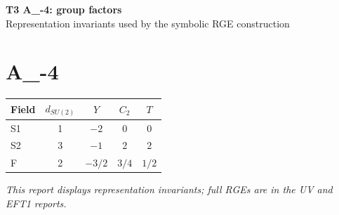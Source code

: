 \documentclass[10pt,a4paper]{article}
\begin{document}
\begin{center}
{\Large\bfseries T3 A\_-4: group factors}\\[4pt]
Representation invariants used by the symbolic RGE construction
\end{center}
\bigskip
\section*{A\_-4}
\begin{longtable}{@{}lcccc@{}}
\toprule Field & $d_{SU(2)}$ & $Y$ & $C_2$ & $T$ \\
\midrule
S1 & 1 & $-2$ & $0$ & $0$ \\
S2 & 3 & $-1$ & $2$ & $2$ \\
F & 2 & $-3/2$ & $3/4$ & $1/2$ \\
\bottomrule
\end{longtable}
\emph{This report displays representation invariants; full RGEs are in the UV and EFT1 reports.}
\end{document}
